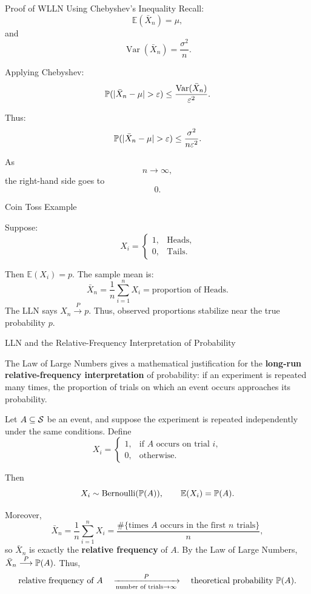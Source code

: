 \begin{frame}{Proof of WLLN Using Chebyshev's Inequality}
Recall:
\[
\mathbb{E}(\bar X_n)=\mu,
\]
and
\[
\operatorname{Var}(\bar X_n)
=
\frac{\sigma^2}{n}.
\]

Applying Chebyshev:
\[
\Prob(|\bar X_n-\mu|>\varepsilon)
\le
\frac{
\operatorname{Var}(\bar X_n)
}{
\varepsilon^2
}.
\]

Thus:
\[
\Prob(|\bar X_n-\mu|>\varepsilon)
\le
\frac{\sigma^2}{n\varepsilon^2}.
\]

As
\[
n\to\infty,
\]
the right-hand side goes to
\[
0.
\]
\end{frame}
\begin{frame}{Coin Toss Example}

Suppose:
\[
X_i=
\begin{cases}
1,&\text{Heads},\\
0,&\text{Tails}.
\end{cases}
\]

Then $\mathbb{E}(X_i)=p.$ The sample mean is:
\[
\bar X_n
=
\frac{1}{n}\sum_{i=1}^n X_i
=
\text{proportion of Heads}.
\]
The LLN says $X_n
\overset{P}{\longrightarrow}
p.$
Thus, observed proportions stabilize near the true probability \(p\).

\end{frame}

\begin{frame}{LLN and the Relative-Frequency Interpretation of Probability}

\begin{keybox}{}
The Law of Large Numbers gives a mathematical justification for the
\textbf{long-run relative-frequency interpretation} of probability:
if an experiment is repeated many times, the proportion of trials on which
an event occurs approaches its probability.
\end{keybox}

Let \(A\subseteq \mathcal{S}\) be an event, and suppose the experiment is repeated
independently under the same conditions. Define
\[
X_i=
\begin{cases}
1, & \text{if } A \text{ occurs on trial } i,\\
0, & \text{otherwise}.
\end{cases}
\]

Then
\[
X_i\sim \operatorname{Bernoulli}(\mathbb{P}(A)),
\qquad
\mathbb{E}(X_i)=\mathbb{P}(A).
\]

Moreover,
\[
\bar X_n
=
\frac{1}{n}\sum_{i=1}^n X_i
=
\frac{\#\{\text{times }A\text{ occurs in the first }n\text{ trials}\}}{n},
\]
so \(\bar X_n\) is exactly the \textbf{relative frequency} of \(A\). By the Law of Large Numbers, $\bar X_n
\overset{P}{\longrightarrow}
\mathbb{P}(A).$ Thus,
\[
\text{relative frequency of }A
\quad
\xrightarrow[\text{number of trials}\to\infty]{P}
\quad
\text{theoretical probability }\mathbb{P}(A).
\]

\end{frame}



